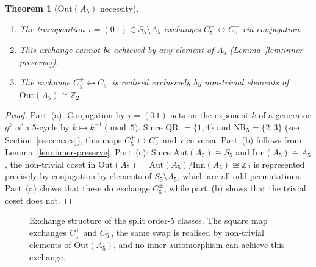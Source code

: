 \documentclass[sn-mathphys-num,Numbered]{sn-jnl}
\theoremstyle{thmstyleone}
\newtheorem{theorem}{Theorem}[section]
\theoremstyle{thmstylethree}
\theoremstyle{thmstyletwo}
\begin{document}
\begin{theorem}[$\mathrm{Out}(A_5)$ necessity]
\label{thm:out-necessity}
\leavevmode
\begin{enumerate}
  \item[(a)] The transposition $\tau = (0\,1) \in S_5 \setminus A_5$
    exchanges $C_5^+ \leftrightarrow C_5^-$ via conjugation.
  \item[(b)] This exchange cannot be achieved by any element of $A_5$
    \textup{(}Lemma~\ref{lem:inner-preserve}\textup{)}.
  \item[(c)] The exchange $C_5^+ \leftrightarrow C_5^-$ is realised
    exclusively by non-trivial elements of
    $\mathrm{Out}(A_5) \cong \mathbb{Z}_2$.
\end{enumerate}
\end{theorem}

\begin{proof}
Part~(a): Conjugation by $\tau = (0\,1)$ acts on the exponent $k$ of
a generator $g^k$ of a $5$-cycle by $k \mapsto k^{-1} \pmod{5}$.  Since
$\mathrm{QR}_5 = \{1,4\}$ and $\mathrm{NR}_5 = \{2,3\}$ (see
Section~\ref{sssec:axes}), this maps $C_5^+ \mapsto C_5^-$ and vice
versa.  Part~(b) follows from Lemma~\ref{lem:inner-preserve}.
Part~(c): Since $\mathrm{Aut}(A_5) \cong S_5$ and
$\mathrm{Inn}(A_5) \cong A_5$, the non-trivial coset in
$\mathrm{Out}(A_5) = \mathrm{Aut}(A_5)/\mathrm{Inn}(A_5) \cong
\mathbb{Z}_2$ is represented precisely by conjugation by elements of
$S_5 \setminus A_5$, which are all odd permutations.  Part~(a) shows
that these do exchange $C_5^\pm$, while part~(b) shows that the trivial
coset does not.
\end{proof}

\begin{figure}[t]
\centering
{}
\caption{Exchange structure of the split order-5 classes. The square map exchanges
$C_5^+$ and $C_5^-$, the same swap is realised by non-trivial elements of
$\mathrm{Out}(A_5)$, and no inner automorphism can achieve this exchange.}
\label{fig:c5-exchange}
\end{figure}
\end{document}
